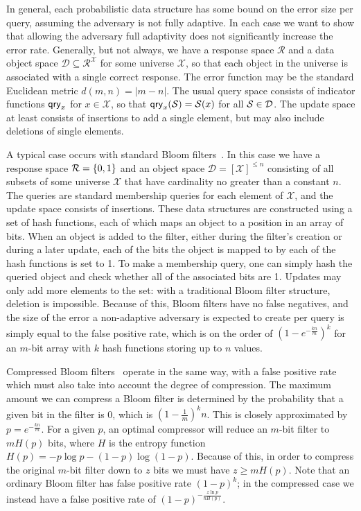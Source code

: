 In general, each probabilistic data structure has some bound on the error size per query, assuming the adversary is not fully adaptive. In each case we want to show that allowing the adversary full adaptivity does not significantly increase the error rate. Generally, but not always, we have a response space $\mathcal{R}$ and a data object space $\mathcal{D} \subseteq \mathcal{R}^\mathcal{X}$ for some universe $\mathcal{X}$, so that each object in the universe is associated with a single correct response. The error function may be the standard Euclidean metric $d(m,n) = |m-n|$. The usual query space consists of indicator functions $\mathsf{qry}_x$ for $x \in \mathcal{X}$, so that $\mathsf{qry}_x(\mathcal{S}) = \mathcal{S}(x)$ for all $\mathcal{S} \in \mathcal{D}$. The update space at least consists of insertions to add a single element, but may also include deletions of single elements.

A typical case occurs with standard Bloom filters~\cite{bloomfilter}. In this case we have a response space $\mathcal{R} = \{0,1\}$ and an object space $\mathcal{D} = [\mathcal{X}]^{\le n}$ consisting of all subsets of some universe $\mathcal{X}$ that have cardinality no greater than a constant $n$. The queries are standard membership queries for each element of $\mathcal{X}$, and the update space consists of insertions. These data structures are constructed using a set of hash functions, each of which maps an object to a position in an array of bits. When an object is added to the filter, either during the filter's creation or during a later update, each of the bits the object is mapped to by each of the hash functions is set to 1. To make a membership query, one can simply hash the queried object and check whether all of the associated bits are 1. Updates may only add more elements to the set: with a traditional Bloom filter structure, deletion is impossible. Because of this, Bloom filters have no false negatives, and the size of the error a non-adaptive adversary is expected to create per query is simply equal to the false positive rate, which is on the order of $(1-e^{-\frac{kn}{m}})^k$ for an $m$-bit array with $k$ hash functions storing up to $n$ values.

Compressed Bloom filters~\cite{xxx} operate in the same way, with a false positive rate which must also take into account the degree of compression. The maximum amount we can compress a Bloom filter is determined by the probability that a given bit in the filter is 0, which is $\left(1-\frac{1}{m}\right)^kn$. This is closely approximated by $p = e^{-\frac{kn}{m}}$. For a given $p$, an optimal compressor will reduce an $m$-bit filter to $mH(p)$ bits, where $H$ is the entropy function $H(p) = -p\log p - (1-p)\log(1-p)$. Because of this, in order to compress the original $m$-bit filter down to $z$ bits we must have $z \ge mH(p)$. Note that an ordinary Bloom filter has false positive rate $(1-p)^k$; in the compressed case we instead have a false positive rate of $(1-p)^{-\frac{z \ln p}{nH(p)}}$.

